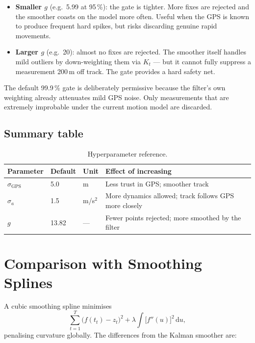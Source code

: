 \documentclass[11pt, a4paper]{article}
\theoremstyle{remark}
\begin{document}
\begin{itemize}
  \item \textbf{Smaller $g$} (e.g.\ 5.99 at 95\,\%): the gate is tighter.
        More fixes are rejected and the smoother coasts on the model more
        often.  Useful when the GPS is known to produce frequent hard
        spikes, but risks discarding genuine rapid movements.

  \item \textbf{Larger $g$} (e.g.\ 20): almost no fixes are rejected.
        The smoother itself handles mild outliers by down-weighting them
        via $K_t$ — but it cannot fully suppress a measurement 200\,m off
        track.  The gate provides a hard safety net.
\end{itemize}

The default 99.9\,\% gate is deliberately permissive because the filter's
own weighting already attenuates mild GPS noise.  Only measurements that
are extremely improbable under the current motion model are discarded.

\subsection{Summary table}

\begin{table}[h]
\centering
\caption{Hyperparameter reference.}
\begin{tabular}{llll}
\toprule
Parameter & Default & Unit & Effect of increasing \\
\midrule
$\sigma_{\mathrm{GPS}}$ & 5.0   & m        & Less trust in GPS; smoother track \\
$\sigma_a$              & 1.5   & m/s$^2$  & More dynamics allowed; track follows GPS more closely \\
$g$                     & 13.82 & ---      & Fewer points rejected; more smoothed by the filter \\
\bottomrule
\end{tabular}
\end{table}

\section{Comparison with Smoothing Splines}

A cubic smoothing spline minimises
\begin{equation}
  \sum_{t=1}^T \bigl(f(t_t) - z_t\bigr)^2
  + \lambda \int \bigl[f''(u)\bigr]^2\, \mathrm{d}u,
  \label{eq:spline}
\end{equation}
penalising curvature globally.  The differences from the Kalman smoother
are:
\end{document}

